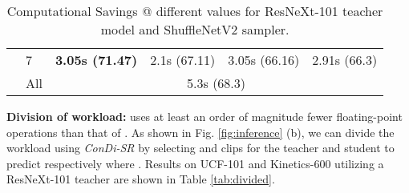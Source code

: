 \documentclass[a4paper,conference]{IEEEtran}
\begin{document}
\begin{table}[h]
\begin{center}
{{\begin{tabular}{ll|cccc}
\multicolumn{1}{l|}{}             & 7     & \multicolumn{1}{c|}{\textbf{3.05s (71.47)}} & \multicolumn{1}{l|}{2.1s (67.11)}  & \multicolumn{1}{c|}{3.05s (66.16)} & 2.91s (66.3)                \\ \cline{2-6} 
\multicolumn{1}{l|}{}             & All & \multicolumn{4}{c}{5.3s (68.3)} \\                        \bottomrule
\end{tabular}
}}
\caption{Computational Savings @ different  values for ResNeXt-101 teacher model and ShuffleNetV2 sampler.}
\label{tab:speed}
\end{center}
\vspace{-15pt}
\end{table}

{\bf Division of workload:}  uses at least an order of magnitude fewer floating-point operations than that of . As shown in Fig. \ref{fig:inference} (b), we can divide the workload using \textit{ConDi-SR} by selecting  and  clips for the teacher and student to predict respectively where . Results on UCF-101 and Kinetics-600 utilizing a ResNeXt-101 teacher are shown in Table \ref{tab:divided}.

\begin{table}[h]
\begin{center}
{}
\vspace{2mm}
\caption{Dividing the workload between the teacher and student at different  values for the ResNeXt-101 teacher model and the ShuffleNetV2 student sampler; This approach will be more useful when a video has more clips (i.e.  is large).}
\label{tab:divided}
\end{center}
\vspace{-5mm}
\end{table}
\end{document}

